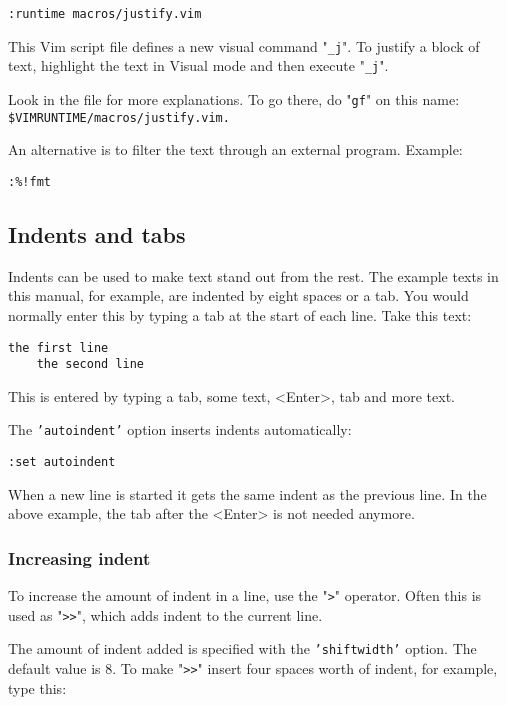 \begin{Verbatim}[samepage=true]
 :runtime macros/justify.vim
\end{Verbatim}

This Vim script file defines a new visual command "\texttt{\_j}".
To justify a block of text, highlight the text in Visual mode and then execute "\texttt{\_j}".

Look in the file for more explanations.
To go there, do "\texttt{gf}" on this name:\\ \texttt{\$VIMRUNTIME/macros/justify.vim.}

An alternative is to filter the text through an external program.
Example:

\begin{Verbatim}[samepage=true]
 :%!fmt
\end{Verbatim}
\subsection{Indents and tabs}
\label{Indents and tabs}
Indents can be used to make text stand out from the rest.  The example texts
in this manual, for example, are indented by eight spaces or a tab.  You would
normally enter this by typing a tab at the start of each line.  Take this
text:

\begin{Verbatim}[samepage=true]
    the first line 
    the second line 
\end{Verbatim}

This is entered by typing a tab, some text, <Enter>, tab and more text.

The \texttt{'autoindent'} option inserts indents automatically:

\begin{Verbatim}[samepage=true]
 :set autoindent
\end{Verbatim}

When a new line is started it gets the same indent as the previous line.
In the above example, the tab after the <Enter> is not needed anymore.

\subsubsection{Increasing indent}
To increase the amount of indent in a line, use the "\texttt{>}" operator.
Often this is used as "\texttt{>>}", which adds indent to the current line.

The amount of indent added is specified with the \texttt{'shiftwidth'} option.
The default value is 8.
To make "\texttt{>>}" insert four spaces worth of indent, for example, type this:

